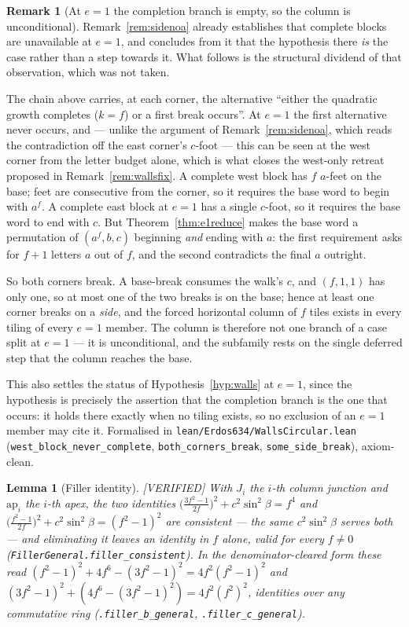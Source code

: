 \documentclass[11pt,reqno]{amsart}
\theoremstyle{plain}
\newtheorem{lemma}[theorem]{Lemma}
\theoremstyle{definition}
\newtheorem{remark}[theorem]{Remark}
\newcommand{\lab}[1]{\hfill\textnormal{\footnotesize\textsc{[#1]}}}
\begin{document}
\begin{remark}[At $e=1$ the completion branch is empty, so the column is unconditional]\label{rem:nocomplete}
Remark~\ref{rem:sidenoa} already establishes that complete blocks are unavailable at $e=1$, and
concludes from it that the hypothesis there \emph{is} the case rather than a step towards it. What
follows is the structural dividend of that observation, which was not taken.

The chain above carries, at each corner, the alternative ``either the quadratic growth completes
($k=f$) or a first break occurs''. At $e=1$ the first alternative never occurs, and --- unlike the
argument of Remark~\ref{rem:sidenoa}, which reads the contradiction off the east corner's $c$-foot
--- this can be seen at the west corner from the letter budget alone, which is what closes the
west-only retreat proposed in Remark~\ref{rem:wallsfix}. A complete west block has $f$ $a$-feet on the base; feet are
consecutive from the corner, so it requires the base word to begin with $a^f$. A complete east block
at $e=1$ has a single $c$-foot, so it requires the base word to end with $c$. But
Theorem~\ref{thm:e1reduce} makes the base word a permutation of $(a^f,b,c)$ beginning \emph{and}
ending with $a$: the first requirement asks for $f+1$ letters $a$ out of $f$, and the second
contradicts the final $a$ outright.

So both corners break. A base-break consumes the walk's $c$, and $(f,1,1)$ has only one, so at most
one of the two breaks is on the base; hence at least one corner breaks on a \emph{side}, and the
forced horizontal column of $f$ tiles exists in every tiling of every $e=1$ member. The column is
therefore not one branch of a case split at $e=1$ --- it is unconditional, and the subfamily rests
on the single deferred step that the column reaches the base.

This also settles the status of Hypothesis~\ref{hyp:walls} at $e=1$, since the hypothesis is
precisely the assertion that the completion branch is the one that occurs: it holds there exactly
when no tiling exists, so no exclusion of an $e=1$ member may cite it. Formalised in
\texttt{lean/Erdos634/WallsCircular.lean} (\texttt{west\_block\_never\_complete},
\texttt{both\_corners\_break}, \texttt{some\_side\_break}), axiom-clean.
\end{remark}

\begin{lemma}[Filler identity]\label{lem:fillerid}\lab{VERIFIED}
With $J_i$ the $i$-th column junction and $\mathrm{ap}_i$ the $i$-th apex, the two identities
$\bigl(\tfrac{3f^2-1}{2f}\bigr)^2+c^2\sin^2\beta=f^4$ and
$\bigl(\tfrac{f^2-1}{2f}\bigr)^2+c^2\sin^2\beta=(f^2-1)^2$
are consistent --- the same $c^2\sin^2\beta$ serves both --- and eliminating it leaves an identity
in $f$ alone, valid for every $f\neq0$ (\texttt{FillerGeneral.filler\_consistent}). In the
denominator-cleared form these read
$(f^2-1)^2+4f^6-(3f^2-1)^2=4f^2(f^2-1)^2$ and $(3f^2-1)^2+(4f^6-(3f^2-1)^2)=4f^2(f^2)^2$,
identities over any commutative ring (\texttt{.filler\_b\_general}, \texttt{.filler\_c\_general}).
\end{lemma}
\end{document}
